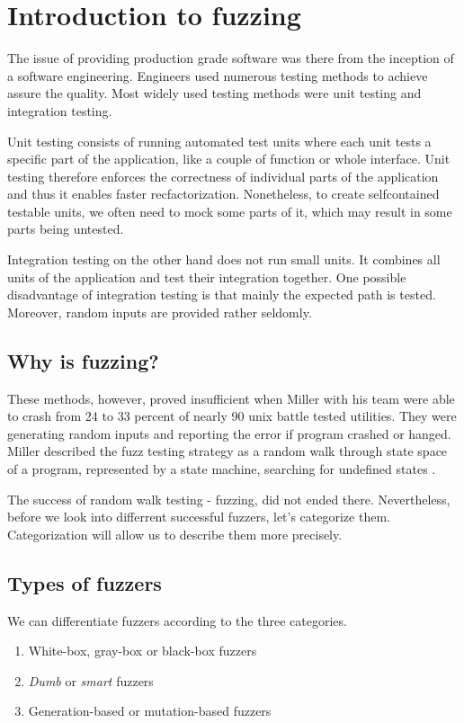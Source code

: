 \chapter{Introduction to fuzzing}
\label{cha:Introduction to fuzzing}
The issue of providing production grade software was there from the inception of a software engineering. Engineers used numerous testing methods to achieve assure the quality. Most widely used testing methods were unit testing and integration testing.

Unit testing consists of running automated test units where each unit tests a specific part of the application, like a couple of function or whole interface. Unit testing therefore enforces the correctness of individual parts of the application and thus it enables faster recfactorization. Nonetheless, to create selfcontained testable units, we often need to mock some parts of it, which may result in some parts being untested.

Integration testing on the other hand does not run small units. It combines all units of the application and test their integration together. One possible disadvantage of integration testing is that mainly the expected path is tested. Moreover, random inputs are provided rather seldomly.

\section{Why is fuzzing?}
These methods, however, proved insufficient when Miller with his team were able to crash from 24 to 33 percent of nearly 90 unix battle tested utilities. They were generating random inputs and reporting the error if program crashed or hanged. Miller described the fuzz testing strategy as a random walk through state space of a program, represented by a state machine, searching for undefined states \cite{miller1990empirical}.

The success of random walk testing - fuzzing, did not ended there. Nevertheless, before we look into differrent successful fuzzers, let's categorize them. Categorization will allow us to describe them more precisely.


\section{Types of fuzzers}
\label{sub:Types of fuzzers}
We can differentiate fuzzers according to the three categories.
\begin{enumerate}
    \item White-box, gray-box or black-box fuzzers
    \item \emph{Dumb} or \emph{smart} fuzzers
    \item Generation-based or mutation-based fuzzers
\end{enumerate}


